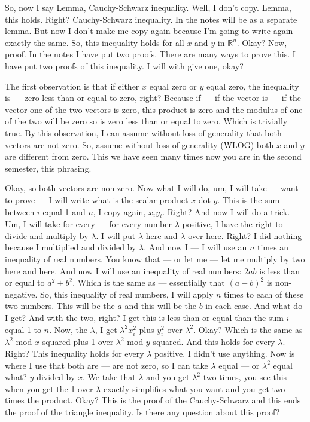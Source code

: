 \begin{spoken-clean}[00:05:50 - 00:08:20]
So, now I say Lemma, Cauchy-Schwarz inequality. Well, I don't copy. Lemma, this holds. Right? Cauchy-Schwarz inequality. In the notes will be as a separate lemma. But now I don't make me copy again because I'm going to write again exactly the same. So, this inequality holds for all $x$ and $y$ in $\mathbb{R}^n$. Okay? Now, proof. In the notes I have put two proofs. There are many ways to prove this. I have put two proofs of this inequality. I will with give one, okay?

The first observation is that if either $x$ equal zero or $y$ equal zero, the inequality is --- zero less than or equal to zero, right? Because if --- if the vector is --- if the vector one of the two vectors is zero, this product is zero and the modulus of one of the two will be zero so is zero less than or equal to zero. Which is trivially true. By this observation, I can assume without loss of generality that both vectors are not zero. So, assume without loss of generality (WLOG) both $x$ and $y$ are different from zero. This we have seen many times now you are in the second semester, this  phrasing.
\end{spoken-clean}

\begin{spoken-clean}[00:08:20 - 00:10:30]
Okay, so both vectors are non-zero. Now what I will do, um, I will take --- want to prove --- I will write what is the scalar product $x$ dot $y$. This is the sum between $i$ equal 1 and $n$, I copy again, $x_i y_i$. Right? And now I will do a trick. Um, I will take for every --- for every number $\lambda$ positive, I have the right to divide and multiply by $\lambda$. I will put $\lambda$ here and $\lambda$ over here. Right? I did nothing because I multiplied and divided by $\lambda$. And now I --- I will use an $n$ times an inequality of real numbers. You know that --- or let me --- let me multiply by two here and here. And now I will use an inequality of real numbers: $2ab$ is less than or equal to $a^2 + b^2$. Which is the same as --- essentially that $(a-b)^2$ is non-negative. So, this inequality of real numbers, I will apply $n$ times to each of these two numbers. This will be the $a$ and this will be the $b$ in each case. And what do I get? And with the two, right? I get this is less than or equal than the sum $i$ equal 1 to $n$. Now, the $\lambda$, I get $\lambda^2 x_i^2$ plus $y_i^2$ over $\lambda^2$. Okay? Which is the same as $\lambda^2$ mod $x$ squared plus 1 over $\lambda^2$ mod $y$ squared. And this holds for every $\lambda$. Right? This inequality holds for every $\lambda$ positive. I didn't use anything. Now is where I use that both are --- are not zero, so I can take $\lambda$ equal --- or $\lambda^2$ equal what? $y$ divided by $x$. We take that $\lambda$ and you get $\lambda^2$ two times, you see this --- when you get the 1 over $\lambda$ exactly simplifies what you want and you get two times the product. Okay? This is the proof of the Cauchy-Schwarz and this ends the proof of the triangle inequality. Is there any question about this proof?
\end{spoken-clean}

